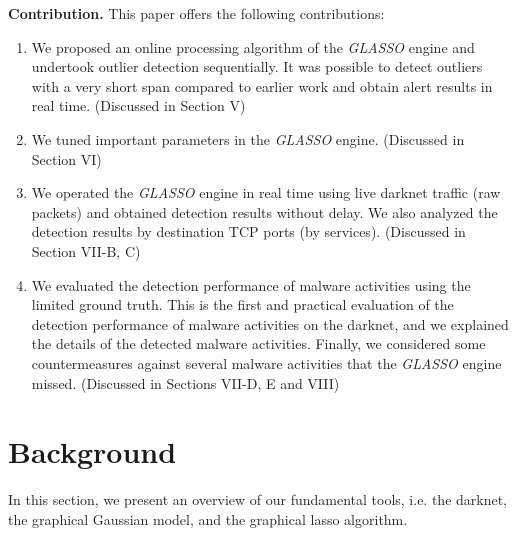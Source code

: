 \documentclass[conference]{IEEEtran}
\begin{document}
\noindent
\textbf{Contribution.}\space\space
This paper offers the following contributions:
\begin{enumerate}
	\item We proposed an online processing algorithm of the {\it GLASSO} engine and undertook outlier detection sequentially.
  It was possible to detect outliers with a very short span compared to earlier work and obtain alert results in real time. (Discussed in Section V)
	\item We tuned important parameters in the {\it GLASSO} engine. (Discussed in Section V\hspace{-.1em}I)
	\item We operated the {\it GLASSO} engine in real time using live darknet traffic (raw packets) and obtained detection results without delay.
  We also analyzed the detection results by destination TCP ports (by services). (Discussed in Section V\hspace{-.1em}I\hspace{-.1em}I-B, C)
  \item We evaluated the detection performance of malware activities using the limited ground truth.
  This is the first and practical evaluation of the detection performance of malware activities on the darknet, and we explained the details of the detected malware activities.
  Finally, we considered some countermeasures against several malware activities that the {\it GLASSO} engine missed. (Discussed in Sections V\hspace{-.1em}I\hspace{-.1em}I-D, E and V\hspace{-.1em}I\hspace{-.1em}I\hspace{-.1em}I)
\end{enumerate}



\section{Background}
In this section, we present an overview of our fundamental tools, i.e. the darknet, the graphical Gaussian model, and the graphical lasso algorithm.
\end{document}
